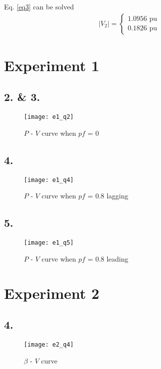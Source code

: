 \documentclass{article}
\begin{document}
Eq. \ref{eq3} can be solved
\begin{align*}
|V_2| =
\begin{cases}
1.0956 \text{ pu}\\
0.1826 \text{ pu}
\end{cases}
\end{align*}


\section*{Experiment 1}

\subsection*{2. \& 3.}
\begin{figure}[H]
\centering
\texttt{[image: e1\_q2]}
\caption{$P$ - $V$ curve when $pf$ = 0}
\end{figure}

\subsection*{4.}
\begin{figure}[H]
\centering
\texttt{[image: e1\_q4]}
\caption{$P$ - $V$ curve when $pf$ = 0.8 lagging}
\end{figure}

\subsection*{5.}
\begin{figure}[H]
\centering
\texttt{[image: e1\_q5]}
\caption{$P$ - $V$ curve when $pf$ = 0.8 leading}
\end{figure}


\section*{Experiment 2}

\subsection*{4.}
\begin{figure}[H]
\centering
\texttt{[image: e2\_q4]}
\caption{$\beta$ - $V$ curve}
\end{figure}

\end{document}

